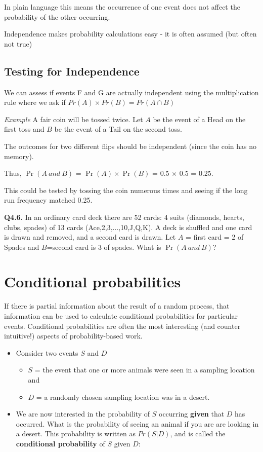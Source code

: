 \documentclass[
  oneside]{krantz}
\providecommand{\tightlist}{%
  \setlength{\itemsep}{0pt}\setlength{\parskip}{0pt}}
\begin{document}
In plain language this means the occurrence of one event does not affect the probability of the other occurring.

Independence makes probability calculations easy - it is often assumed (but often not true)

\hypertarget{testing-for-independence}{%
\subsection{Testing for Independence}\label{testing-for-independence}}

We can assess if events F and G are actually independent using the multiplication rule where we ask if \(Pr(A) \times Pr(B)=Pr(A \cap B)\)

\emph{Example} A fair coin will be tossed twice. Let \(A\) be the event of
a Head on the first toss and \(B\) be the event of a Tail on the second toss.

The outcomes for two different flips should be independent (since the coin has no memory).

Thus, \(\Pr(A ~and~ B)\) = \(\Pr(A) \times \Pr(B)\) = 0.5 \(\times\) 0.5 = 0.25.

This could be tested by tossing the coin numerous times and seeing if the long run frequency matched 0.25.

\textbf{Q4.6.} In an ordinary card deck there are 52 cards: 4 suits (diamonds, hearts,
clubs, spades) of 13 cards (Ace,2,3,\(\ldots\),10,J,Q,K). A deck is shuffled
and one card is drawn and removed, and a second card is drawn. Let \(A\) = first
card = 2 of Spades and \(B\)=second card is 3 of spades. What is \(\Pr(A ~and~ B)\)?

\hypertarget{conditional-probabilities}{%
\section{Conditional probabilities}\label{conditional-probabilities}}

If there is partial information about the result of a random process, that
information can be used to calculate conditional probabilities for particular events. Conditional probabilities are often the most interesting (and counter intuitive!) aspects of probability-based work.

\begin{itemize}
\item
  Consider two events \(S\) and \(D\)

  \begin{itemize}
  \tightlist
  \item
    \(S\) = the event that one or more animals were seen in a sampling location and
  \item
    \(D\) = a randomly chosen sampling location was in a desert.
  \end{itemize}
\item
  We are now interested in the probability of \(S\) occurring \textbf{given} that \(D\) has occurred. What is the probability of seeing an animal if you are are looking in a desert. This probability is written as \(Pr (S|D)\), and is called the \textbf{conditional probability} of \(S\) given \(D\):
\end{itemize}
\end{document}
